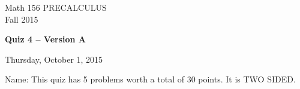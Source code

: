 \documentclass[11pt]{article}
\begin{document}
\begin{center}
\vspace{2in}

\huge{Math 156 PRECALCULUS \\
Fall 2015}

\vfill

\huge{\bf{Quiz 4 -- Version A}}\\

\vspace{0.5in}

\large{Thursday, October 1, 2015}\\

\vfill


{\huge{Name:{\underline{\hspace{2in}}}}}
\vfill
This quiz has 5 problems worth a total of 30 points. It is TWO SIDED. 
\vfill
\end{center}
\newpage
\restoregeometry
\end{document}
